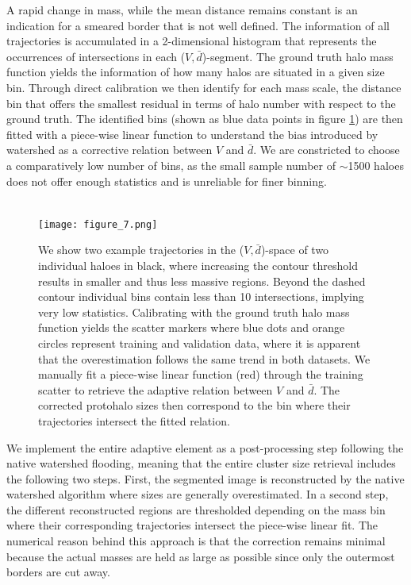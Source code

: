 \documentclass[fleqn,usenatbib]{mnras}
\begin{document}
A rapid change in mass, while the mean distance remains constant is an indication for a smeared border that is not well defined. The information of all trajectories is accumulated in a 2-dimensional histogram that represents the occurrences of intersections in each ($V,\bar{d}$)-segment. 
The ground truth halo mass function yields the information of how many halos are situated in a given size bin.
Through direct calibration we then identify for each mass scale, the distance bin that offers the smallest residual in terms of halo number with respect to the ground truth. The identified bins (shown as blue data points in figure \ref{fig:fit}) are then fitted with a piece-wise linear function to understand the bias introduced by watershed as a corrective relation between $V$ and $\bar{d}$. We are constricted to choose a comparatively low number of bins, as the small sample number of $\sim$1500 haloes does not offer enough statistics and is unreliable for finer binning.\\ \\
\begin{figure}
 \texttt{[image: figure\_7.png]}
 \caption{We show two example trajectories in the ($V,\bar{d}$)-space of two individual haloes in black, where increasing the contour threshold results in smaller and thus less massive regions.
 Beyond the dashed contour individual bins contain less than 10 intersections, implying very low statistics. Calibrating with the ground truth halo mass function yields the scatter markers where blue dots and orange circles represent training and validation data, where it is apparent that the overestimation follows the same trend in both datasets. We manually fit a piece-wise linear function (red) through the training scatter to retrieve the adaptive relation between $V$ and $\bar{d}$. The corrected protohalo sizes then correspond to the bin where their trajectories intersect the fitted relation.}
 \label{fig:fit}
\end{figure}
We implement the entire adaptive element as a post-processing step following the native watershed flooding, meaning that the entire cluster size retrieval includes the following two steps. First, the segmented image is reconstructed by the native watershed algorithm where sizes are generally overestimated. In a second step, the different reconstructed regions are thresholded depending on the mass bin where their corresponding trajectories intersect the piece-wise linear fit.
The numerical reason behind this approach is that the correction remains minimal because the actual masses are held as large as possible since only the outermost borders are cut away.
\end{document}
